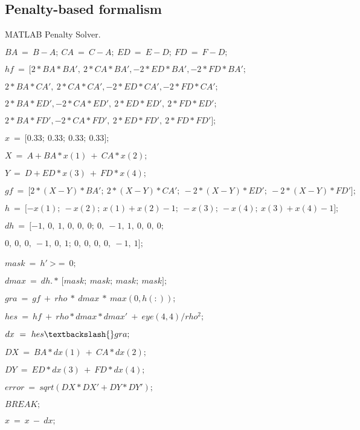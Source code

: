 \subsection{Penalty-based formalism}

\begin{algorithm}
	\protect\caption{\label{alg4}MATLAB Penalty Solver.}
	\begin{algorithmic}[1]

		\State $BA~=~B-A;~CA~=~C-A;~ED~=~E-D;~FD~=~F-D;$

		\State $hf~=~{[}2{*}BA{*}BA',~2{*}CA{*}BA',-2{*}ED{*}BA',-2{*}FD{*}BA';$

		\State $2{*}BA{*}CA',~2{*}CA{*}CA',-2{*}ED{*}CA',-2{*}FD{*}CA';$

		\State $2{*}BA{*}ED',-2{*}CA{*}ED',~2{*}ED{*}ED',~2{*}FD{*}ED';$

		\State $2{*}BA{*}FD',-2{*}CA{*}FD',~2{*}ED{*}FD',~2{*}FD{*}FD'{]};$

		\State $x~=~{[}0.33;~0.33;~0.33;~0.33{]};$


			\State $X~=~A+BA{*}x(1)~+~CA{*}x(2);$

			\State $Y~=~D+ED{*}x(3)~+~FD{*}x(4);$

			\State $gf~=~{[}2{*}(X-Y){*}BA';~2{*}(X-Y){*}CA';~-2{*}(X-Y){*}ED';~-2{*}(X-Y){*}FD'{]};$

			\State $h~=~{[}-x(1);~-x(2);~x(1)+x(2)-1;~-x(3);~-x(4);~x(3)+x(4)-1{]};$

			\State $dh~=~{[}-1,~0,~1,~0,~0,~0;~0,~-1,~1,~0,~0,~0;$

			\State $0,~0,~0,~-1,~0,~1;~0,~0,~0,~0,~-1,~1{]};$

			\State $mask~=~h'~$>$=~0;$

			\State $dmax~=~dh.{*}~{[}mask;~mask;~mask;~mask{]};$

			\State $gra~=~gf~+~rho~{*}~dmax~{*}~max(0,h(:));$

			\State $hes~=~hf~+~rho{*}dmax{*}dmax'~+~eye(4,4)/rho^2;$

			\State $dx~=~hes\textbackslash{}gra;$

			\State $DX~=~BA{*}dx(1)~+~CA{*}dx(2);$

			\State $DY~=~ED{*}dx(3)~+~FD{*}dx(4);$

			\State $error~=~sqrt(DX{*}DX'+DY{*}DY');$

				\State $BREAK;$
			\EndIf

			\State $x~=~x~-~dx;$

		\EndFor

	\EndFunction
	\end{algorithmic}

\end{algorithm}